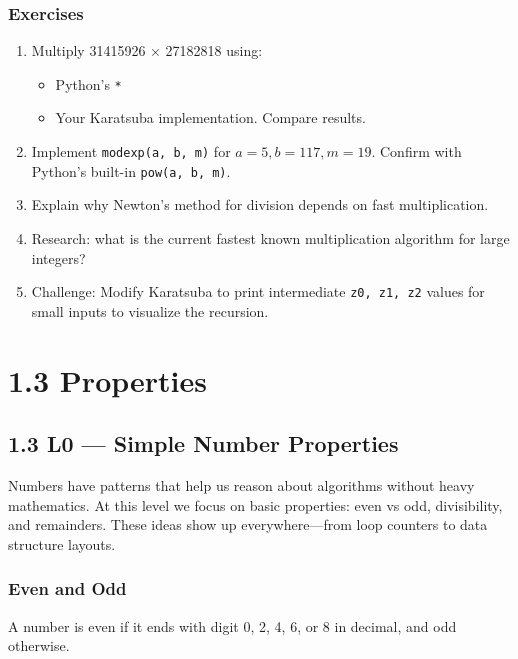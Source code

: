 \documentclass[
  letterpaper,
  DIV=11,
  numbers=noendperiod]{scrreprt}
\providecommand{\tightlist}{%
  \setlength{\itemsep}{0pt}\setlength{\parskip}{0pt}}
\begin{document}
\subsubsection{Exercises}\label{exercises-5}

\begin{enumerate}
\def\labelenumi{\arabic{enumi}.}
\item
  Multiply 31415926 × 27182818 using:

  \begin{itemize}
  \tightlist
  \item
    Python's \texttt{*}
  \item
    Your Karatsuba implementation. Compare results.
  \end{itemize}
\item
  Implement \texttt{modexp(a,\ b,\ m)} for \(a=5, b=117, m=19\). Confirm
  with Python's built-in \texttt{pow(a,\ b,\ m)}.
\item
  Explain why Newton's method for division depends on fast
  multiplication.
\item
  Research: what is the current fastest known multiplication algorithm
  for large integers?
\item
  Challenge: Modify Karatsuba to print intermediate
  \texttt{z0,\ z1,\ z2} values for small inputs to visualize the
  recursion.
\end{enumerate}

\section{1.3 Properties}\label{properties}

\subsection{1.3 L0 --- Simple Number
Properties}\label{l0-simple-number-properties}

Numbers have patterns that help us reason about algorithms without heavy
mathematics. At this level we focus on basic properties: even vs odd,
divisibility, and remainders. These ideas show up everywhere---from loop
counters to data structure layouts.

\subsubsection{Even and Odd}\label{even-and-odd}

A number is even if it ends with digit 0, 2, 4, 6, or 8 in decimal, and
odd otherwise.
\end{document}
